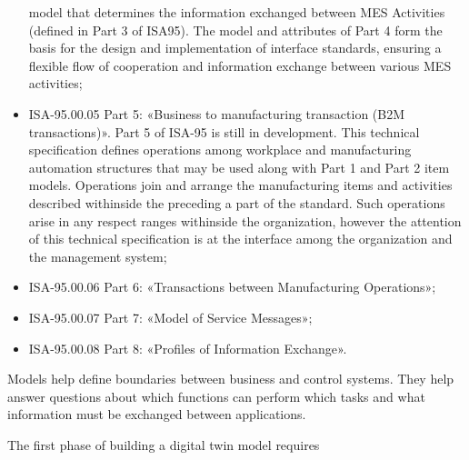 \documentclass{article}
\begin{document}
\begin{multicols}{2}
\begin{itemize}
model that determines the information exchanged
between MES Activities (defined in Part 3 of ISA95). The model and attributes of Part 4 form the
basis for the design and implementation of interface
standards, ensuring a flexible flow of cooperation
and information exchange between various MES
activities;
    \renewcommand{\labelitemi}{5)}
    \item ISA-95.00.05 Part 5: «Business to manufacturing
transaction (B2M transactions)». Part 5 of ISA-95
is still in development. This technical specification
defines operations among workplace and manufacturing automation structures that may be used along
with Part 1 and Part 2 item models. Operations join
and arrange the manufacturing items and activities
described withinside the preceding a part of the
standard. Such operations arise in any respect ranges
withinside the organization, however the attention of
this technical specification is at the interface among
the organization and the management system;
\renewcommand{\labelitemi}{6)}
    \item ISA-95.00.06 Part 6: «Transactions between Manufacturing Operations»;
\renewcommand{\labelitemi}{7)}
    \item ISA-95.00.07 Part 7: «Model of Service Messages»;
\renewcommand{\labelitemi}{8)}
    \item ISA-95.00.08 Part 8: «Profiles of Information Exchange».
\end{itemize} \par
Models help define boundaries between business and
control systems. They help answer questions about which
functions can perform which tasks and what information
must be exchanged between applications. \par
The first phase of building a digital twin model requires
\end{multicols}
\end{document}
